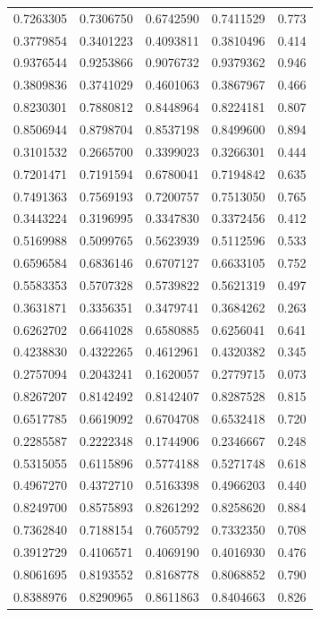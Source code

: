 \documentclass[
  letterpaper,
  DIV=11,
  numbers=noendperiod]{scrartcl}
\begin{document}
\begin{longtable}[]{@{}rrrrr@{}}
0.7263305 & 0.7306750 & 0.6742590 & 0.7411529 & 0.773 \\
0.3779854 & 0.3401223 & 0.4093811 & 0.3810496 & 0.414 \\
0.9376544 & 0.9253866 & 0.9076732 & 0.9379362 & 0.946 \\
0.3809836 & 0.3741029 & 0.4601063 & 0.3867967 & 0.466 \\
0.8230301 & 0.7880812 & 0.8448964 & 0.8224181 & 0.807 \\
0.8506944 & 0.8798704 & 0.8537198 & 0.8499600 & 0.894 \\
0.3101532 & 0.2665700 & 0.3399023 & 0.3266301 & 0.444 \\
0.7201471 & 0.7191594 & 0.6780041 & 0.7194842 & 0.635 \\
0.7491363 & 0.7569193 & 0.7200757 & 0.7513050 & 0.765 \\
0.3443224 & 0.3196995 & 0.3347830 & 0.3372456 & 0.412 \\
0.5169988 & 0.5099765 & 0.5623939 & 0.5112596 & 0.533 \\
0.6596584 & 0.6836146 & 0.6707127 & 0.6633105 & 0.752 \\
0.5583353 & 0.5707328 & 0.5739822 & 0.5621319 & 0.497 \\
0.3631871 & 0.3356351 & 0.3479741 & 0.3684262 & 0.263 \\
0.6262702 & 0.6641028 & 0.6580885 & 0.6256041 & 0.641 \\
0.4238830 & 0.4322265 & 0.4612961 & 0.4320382 & 0.345 \\
0.2757094 & 0.2043241 & 0.1620057 & 0.2779715 & 0.073 \\
0.8267207 & 0.8142492 & 0.8142407 & 0.8287528 & 0.815 \\
0.6517785 & 0.6619092 & 0.6704708 & 0.6532418 & 0.720 \\
0.2285587 & 0.2222348 & 0.1744906 & 0.2346667 & 0.248 \\
0.5315055 & 0.6115896 & 0.5774188 & 0.5271748 & 0.618 \\
0.4967270 & 0.4372710 & 0.5163398 & 0.4966203 & 0.440 \\
0.8249700 & 0.8575893 & 0.8261292 & 0.8258620 & 0.884 \\
0.7362840 & 0.7188154 & 0.7605792 & 0.7332350 & 0.708 \\
0.3912729 & 0.4106571 & 0.4069190 & 0.4016930 & 0.476 \\
0.8061695 & 0.8193552 & 0.8168778 & 0.8068852 & 0.790 \\
0.8388976 & 0.8290965 & 0.8611863 & 0.8404663 & 0.826 \\

\end{longtable}
\end{document}

